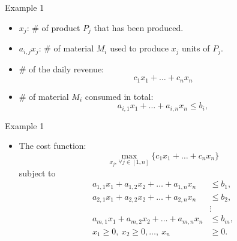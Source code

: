 \documentclass[aspectratio=169,hyperref,UTF8,CJK]{beamer}
\begin{document}
\begin{frame}{Example 1}
  \begin{itemize}
    \item $x_j$: \# of product $P_j$ that has been produced.
    \item $a_{i,j}x_j$: \# of material $M_i$ used to produce $x_j$ units of $P_j$.
    \item \# of the daily revenue:
      \begin{equation}\tag{6}
        c_1x_1+\ldots+c_nx_n
      \end{equation}
    \item \# of material $M_i$ consumed in total:
      \begin{equation}\tag{7}
        a_{i,1}x_1+\ldots+a_{i,n}x_n\le b_i,
      \end{equation}
  \end{itemize}
\end{frame}

\begin{frame}{Example 1}
  \small
  \begin{itemize}
    \item The cost function:
      \begin{equation}\tag{8}
        \max_{x_j,\,\forall j\in[1,n]}\{c_1x_1+\ldots+c_nx_n\}
      \end{equation}
      subject to
      \begin{equation}\tag{9}
      \begin{aligned}
        a_{1,1}x_1+a_{1,2}x_2+\ldots+a_{1,n}x_n&\le b_1,\\
        a_{2,1}x_1+a_{2,2}x_2+\ldots+a_{2,n}x_n&\le b_2,\\
        &\vdots\\
        a_{m,1}x_1+a_{m,2}x_2+\ldots+a_{m,n}x_n&\le b_m,\\
        x_1\ge0,\ x_2\ge0,\ldots,\ x_n&\ge0.
      \end{aligned}
      \end{equation}
  \end{itemize}
\end{frame}
\end{document}
